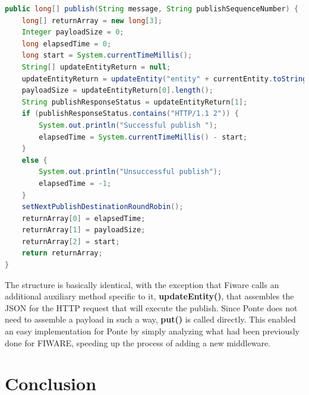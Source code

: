 \documentclass[conference]{IEEEtran}
\begin{document}
\begin{lstlisting}[caption=Publish method for FIWARE, captionpos=b, label=lst:fiware_publish_method, language=java]
public long[] publish(String message, String publishSequenceNumber) {
	long[] returnArray = new long[3];
	Integer payloadSize = 0;
	long elapsedTime = 0;
	long start = System.currentTimeMillis();
	String[] updateEntityReturn = null;
	updateEntityReturn = updateEntity("entity" + currentEntity.toString(), "attribute_name" + currentAttribute.toString(), message + "-" + publishSequenceNumber);
	payloadSize = updateEntityReturn[0].length();
	String publishResponseStatus = updateEntityReturn[1];
	if (publishResponseStatus.contains("HTTP/1.1 2")) {
		System.out.println("Successful publish ");
		elapsedTime = System.currentTimeMillis() - start;
	}
	else {
		System.out.println("Unsuccessful publish");
		elapsedTime = -1;
	}		
	setNextPublishDestinationRoundRobin();
	returnArray[0] = elapsedTime;
	returnArray[1] = payloadSize;
	returnArray[2] = start;
	return returnArray;
}
\end{lstlisting}

The structure is basically identical, with the exception that Fiware calls an additional auxiliary method specific to it, \textbf{updateEntity()}, that assembles the JSON for the HTTP request that will execute the publish. Since Ponte does not need to assemble a payload in such a way, \textbf{put()} is called directly. This enabled an easy implementation for Ponte by simply analyzing what had been previously done for FIWARE, speeding up the process of adding a new middleware. 

\section{Conclusion}





%
%
%





\end{document}
